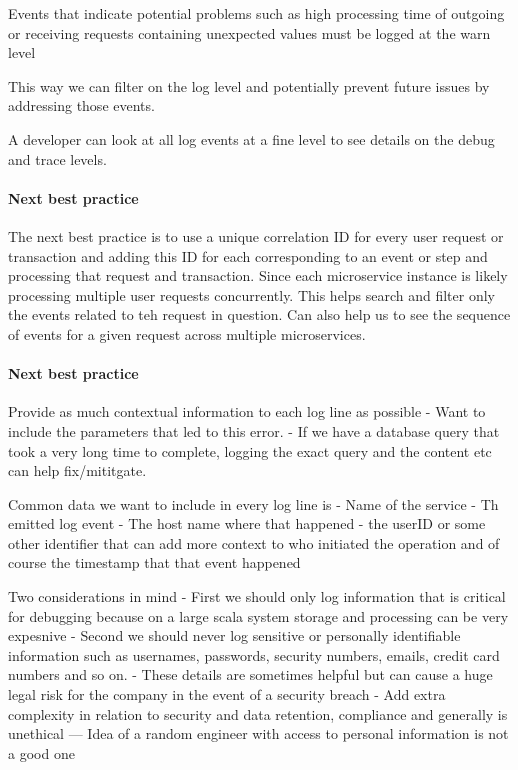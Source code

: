 \documentclass[a4paper, 11pt]{book}
\begin{document}
{    Events that indicate potential problems such as high processing time of outgoing or receiving requests containing unexpected values must be logged at the warn level

    This way we can filter on the log level and potentially prevent future issues by addressing those events.

    A developer can look at all log events at a fine level to see details on the debug and trace levels.

    \paragraph{Next best practice}
    The next best practice is to use a unique correlation ID for every user request or transaction and adding this ID for each corresponding to an event or step and processing that request and transaction.
    Since each microservice instance is likely processing multiple user requests concurrently.
    This helps search and filter only the events related to teh request in question.
    Can also help us to see the sequence of events for a given request across multiple microservices.

    \paragraph{Next best practice}
    Provide as much contextual information to each log line as possible
    - Want to include the parameters that led to this error.
    - If we have a database query that took a very long time to complete, logging the exact query and the content etc can help fix/mititgate.

    Common data we want to include in every log line is
    - Name of the service
    - Th emitted log event
    - The host name where that happened
    - the userID or some other identifier that can add more context to who initiated the operation and of course the timestamp that that event happened

    Two considerations in mind
    - First we should only log information that is critical for debugging because on a large scala system storage and processing can be very expesnive
    - Second we should never log sensitive or personally identifiable information such as usernames, passwords, security numbers, emails, credit card numbers and so on.
    - These details are sometimes helpful but can cause a huge legal risk for the company in the event of a security breach
    - Add extra complexity in relation to security and data retention, compliance and generally is unethical
    --- Idea of a random engineer with access to personal information is not a good one

}
\end{document}
